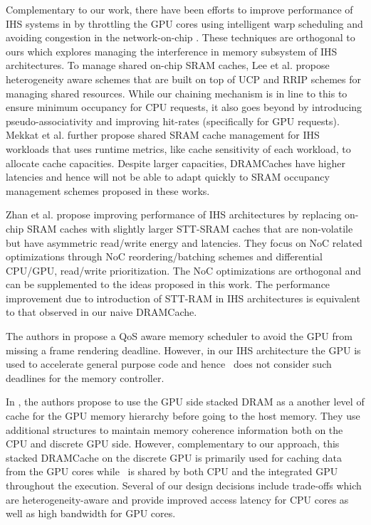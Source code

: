\par Complementary to our work, there have been efforts to improve performance of IHS systems in \cite{gpu-concurrency} by throttling the GPU cores using intelligent warp scheduling and avoiding congestion in the network-on-chip \cite{interconnect}. These techniques are orthogonal to ours which explores managing the interference in memory subsystem of IHS architectures. To manage shared on-chip SRAM caches, Lee et al. \cite{tap} propose heterogeneity aware schemes that are built on top of UCP and RRIP schemes for managing shared  resources. While our chaining mechanism is in line to this to ensure minimum occupancy for CPU requests, it also goes beyond by introducing pseudo-associativity and improving hit-rates (specifically for GPU requests). Mekkat et al. \cite{helm} further propose shared SRAM cache management for IHS workloads that uses runtime metrics, like cache sensitivity of each workload, to allocate cache capacities. Despite larger capacities, DRAMCaches have higher latencies and hence will not be able to adapt quickly to SRAM occupancy management schemes proposed in these works.
\par Zhan et al. \cite{oscar} propose improving performance of IHS architectures by replacing on-chip SRAM caches with slightly larger STT-SRAM caches that are non-volatile but have asymmetric read/write energy and latencies. They focus on NoC related optimizations through NoC reordering/batching schemes and differential CPU/GPU, read/write prioritization. The NoC optimizations are orthogonal and can be supplemented to the ideas proposed in this work. The performance improvement due to introduction of STT-RAM in IHS architectures is equivalent to that observed in our naive DRAMCache.
\par The authors in \cite{qos-aware} propose a QoS aware memory scheduler to avoid the GPU from missing a frame rendering deadline. However, in our IHS architecture the GPU is used to accelerate general purpose code and hence \prioname\ does not consider such deadlines for the memory controller.
\par In \cite{umh}, the authors propose to use the GPU side stacked DRAM as a another level of cache for the GPU memory hierarchy before going to the host memory. They use additional structures to maintain memory coherence information both on the CPU and discrete GPU side. However, complementary to our approach, this stacked DRAMCache on the discrete GPU is primarily used for caching data from the GPU cores while \cachename\ is shared by both CPU and the integrated GPU throughout the execution. Several of our design decisions include trade-offs which are heterogeneity-aware and provide improved access latency for CPU cores as well as high bandwidth for GPU cores.
